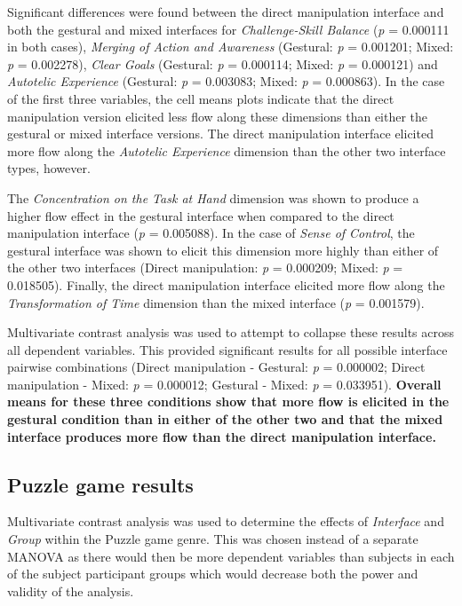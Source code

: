 Significant differences were found between the direct manipulation interface and both the gestural and mixed interfaces for \emph{Challenge-Skill Balance} (\emph{p} = 0.000111 in both cases), \emph{Merging of Action and Awareness} (Gestural: \emph{p} = 0.001201; Mixed: \emph{p} = 0.002278), \emph{Clear Goals} (Gestural: \emph{p} = 0.000114; Mixed: \emph{p} = 0.000121) and \emph{Autotelic Experience} (Gestural: \emph{p} = 0.003083; Mixed: \emph{p} = 0.000863). In the case of the first three variables, the cell means plots indicate that the direct manipulation version elicited less flow along these dimensions than either the gestural or mixed interface versions. The direct manipulation interface elicited more flow along the \emph{Autotelic Experience} dimension than the other two interface types, however. 

The \emph{Concentration on the Task at Hand} dimension was shown to produce a higher flow effect in the gestural interface when compared to the direct manipulation interface (\emph{p} = 0.005088). In the case of \emph{Sense of Control}, the gestural interface was shown to elicit this dimension more highly than either of the other two interfaces (Direct manipulation: \emph{p} = 0.000209; Mixed: \emph{p} = 0.018505). Finally, the direct manipulation interface elicited more flow along the \emph{Transformation of Time} dimension than the mixed interface (\emph{p} = 0.001579).

Multivariate contrast analysis was used to attempt to collapse these results across all dependent variables. This provided significant results for all possible interface pairwise combinations (Direct manipulation - Gestural: \emph{p} = 0.000002; Direct manipulation - Mixed: \emph{p} = 0.000012; Gestural - Mixed: \emph{p} = 0.033951). {\bf Overall means for these three conditions show that more flow is elicited in the gestural condition than in either of the other two and that the mixed interface produces more flow than the direct manipulation interface.}

\subsection{Puzzle game results}
Multivariate contrast analysis was used to determine the effects of \emph{Interface} and \emph{Group} within the Puzzle game genre. This was chosen instead of a separate MANOVA as there would then be more dependent variables than subjects in each of the subject participant groups which would decrease both the power and validity of the analysis. 

